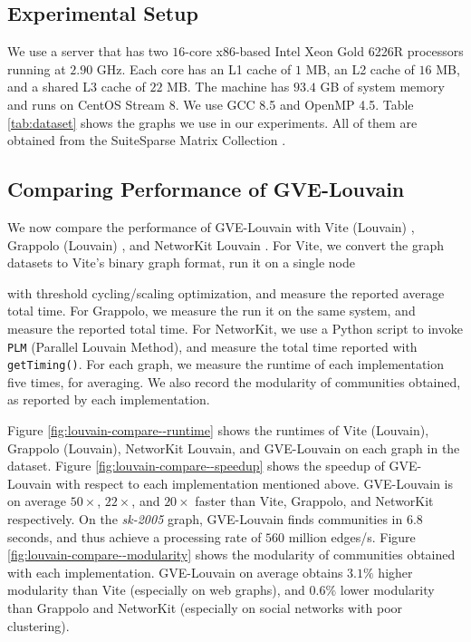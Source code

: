 \subsection{Experimental Setup}
\label{sec:setup}

We use a server that has two $16$-core x86-based Intel Xeon Gold 6226R processors running at $2.90$ GHz. Each core has an L1 cache of $1$ MB, an L2 cache of $16$ MB, and a shared L3 cache of $22$ MB. The machine has $93.4$ GB of system memory and runs on CentOS Stream 8. We use GCC 8.5 and OpenMP 4.5. Table \ref{tab:dataset} shows the graphs we use in our experiments. All of them are obtained from the SuiteSparse Matrix Collection \cite{suite19}.







\subsection{Comparing Performance of GVE-Louvain}
\label{sec:comparison}

We now compare the performance of GVE-Louvain with Vite (Louvain) \cite{ghosh2018scalable}, Grappolo (Louvain) \cite{com-halappanavar17}, and NetworKit Louvain \cite{staudt2016networkit}. For Vite, we convert the graph datasets to Vite's binary graph format, run it on a single node with threshold cycling/scaling optimization, and measure the reported average total time. For Grappolo, we measure the run it on the same system, and measure the reported total time. For NetworKit, we use a Python script to invoke \texttt{PLM} (Parallel Louvain Method), and measure the total time reported with \texttt{getTiming()}. For each graph, we measure the runtime of each implementation five times, for averaging. We also record the modularity of communities obtained, as reported by each implementation.

Figure \ref{fig:louvain-compare--runtime} shows the runtimes of Vite (Louvain), Grappolo (Louvain), NetworKit Louvain, and GVE-Louvain on each graph in the dataset. Figure \ref{fig:louvain-compare--speedup} shows the speedup of GVE-Louvain with respect to each implementation mentioned above. GVE-Louvain is on average $50\times$, $22\times$, and $20\times$ faster than Vite, Grappolo, and NetworKit respectively. On the \textit{sk-2005} graph, GVE-Louvain finds communities in $6.8$ seconds, and thus achieve a processing rate of $560$ million edges/s. Figure \ref{fig:louvain-compare--modularity} shows the modularity of communities obtained with each implementation. GVE-Louvain on average obtains $3.1\%$ higher modularity than Vite (especially on web graphs), and $0.6\%$ lower modularity than Grappolo and NetworKit (especially on social networks with poor clustering).

